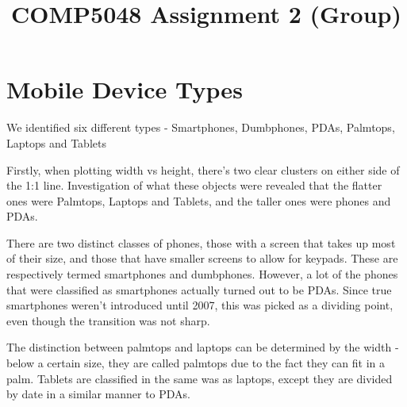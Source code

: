 \documentclass[conference]{IEEEtran}
\begin{document}
\title{COMP5048 Assignment 2 (Group)}

\author{
\and
{}
\IEEEauthorblockA{}
\and
{}
\and
{}
\IEEEauthorblockA{}
\and
{}
\IEEEauthorblockA{}
}

\maketitle

\begin{abstract}
\end{abstract}


\section{Mobile Device Types}

We identified six different types - Smartphones, Dumbphones, PDAs, Palmtops, Laptops and Tablets

Firstly, when plotting width vs height, there's two clear clusters on either side of the 1:1 line. Investigation of what these objects were revealed that the flatter ones were Palmtops, Laptops and Tablets, and the taller ones were phones and PDAs.

There are two distinct classes of phones, those with a screen that takes up most of their size, and those that have smaller screens to allow for keypads. These are respectively termed smartphones and dumbphones. However, a lot of the phones that were classified as smartphones actually turned out to be PDAs. Since true smartphones weren't introduced until 2007, this was picked as a dividing point, even though the transition was not sharp.

The distinction between palmtops and laptops can be determined by the width - below a certain size, they are called palmtops due to the fact they can fit in a palm. Tablets are classified in the same was as laptops, except they are divided by date in a similar manner to PDAs.
\end{document}
